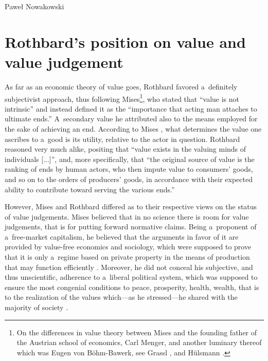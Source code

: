 \begin{artengenv}{Paweł Nowakowski}
\section{Rothbard's position on value and value judgement}

As far as an economic theory of value goes, Rothbard favored a~definitely subjectivist approach, thus following Mises\footnote{On the differences in value theory between Mises and the founding father of the Austrian school of economics, Carl Menger, and another luminary thereof which was Eugen von Böhm-Bawerk, see Grassl 
\parencite*[][pp.531–559]{Grassl2017Toward}, %
 and Hülsmann 
\parencite*[][pp.388–391]{Hulsmann2007Mises}.%
}, who stated that ``value is not intrinsic'' and instead defined it as the ``importance that acting man attaches to ultimate ends.'' A~secondary value he attributed also to the means employed for the sake of achieving an end. According to Mises 
\parencite*[][p.121]{Mises2008Human}, %
 what determines the value one ascribes to a~good is its utility, relative to the actor in question. Rothbard 
\parencite*[][pp.103]{Rothbard2009Man} %
 reasoned very much alike, positing that ``value exists in the valuing minds of individuals [...]'', and, more specifically, that ``the original source of value is the ranking of ends by human actors, who then impute value to consumers' goods, and so on to the orders of producers' goods, in accordance with their expected ability to contribute toward serving the various ends.''



However, Mises and Rothbard differed as to their respective views on the status of value judgements. Mises 
\parencite*[see, e.g.][p.10]{Mises2008Human} %
 believed that in no science there is room for value judgements, that is for putting forward normative claims. Being a~proponent of a~free-market capitalism, he believed that the arguments in favor of it are provided by value-free economics and sociology, which were supposed to prove that it is only a~regime based on private property in the means of production that may function efficiently 
\parencite[][p.86]{Mises2010Liberalism}. %
 Moreover, he did not conceal his subjective, and thus unscientific, adherence to a~liberal political system, which was supposed to ensure the most congenial conditions to peace, prosperity, health, wealth, that is to the realization of the values which---as he stressed---he shared with the majority of society 
\parencite[see][pp.93–94]{Rothbard1997Praxeology}.%





\end{artengenv}

